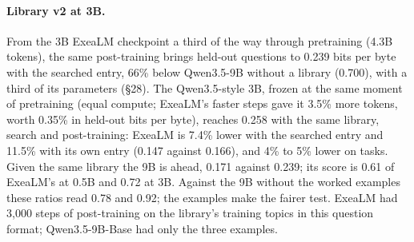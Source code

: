\documentclass[10pt,twocolumn,letterpaper]{article}
\newcommand{\sect}[1]{\S#1}
\begin{document}
\paragraph{Library v2 at 3B.}
From the 3B ExeaLM checkpoint a third of the way through pretraining (4.3B tokens), the same post-training brings held-out questions to 0.239 bits per byte with the searched entry, 66\% below Qwen3.5-9B without a library (0.700), with a third of its parameters (\sect{28}).
The Qwen3.5-style 3B, frozen at the same moment of pretraining (equal compute; ExeaLM's faster steps gave it 3.5\% more tokens, worth 0.35\% in held-out bits per byte), reaches 0.258 with the same library, search and post-training: ExeaLM is 7.4\% lower with the searched entry and 11.5\% with its own entry (0.147 against 0.166), and 4\% to 5\% lower on tasks.
Given the same library the 9B is ahead, 0.171 against 0.239; its score is 0.61 of ExeaLM's at 0.5B and 0.72 at 3B.
Against the 9B without the worked examples these ratios read 0.78 and 0.92; the examples make the fairer test.
ExeaLM had 3,000 steps of post-training on the library's training topics in this question format; Qwen3.5-9B-Base had only the three examples.
\end{document}
